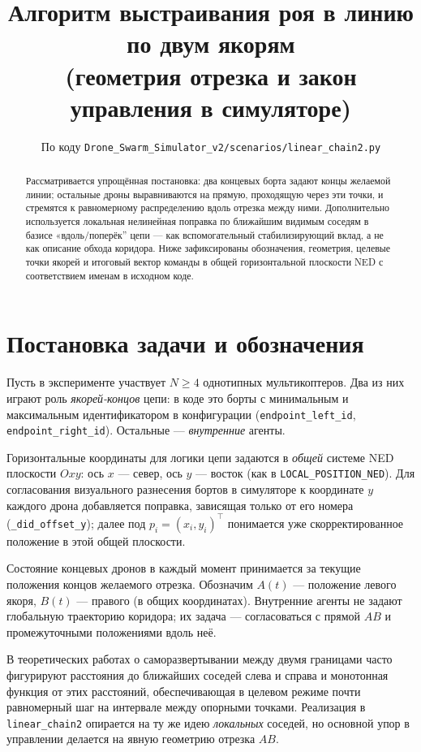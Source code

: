 \documentclass[12pt,a4paper]{article}
\title{Алгоритм выстраивания роя в линию по двум якорям\\
(геометрия отрезка и закон управления в симуляторе)}
\author{По коду \texttt{Drone\_Swarm\_Simulator\_v2/scenarios/linear\_chain2.py}}
\date{}
\begin{document}
\maketitle

\begin{abstract}
Рассматривается упрощённая постановка: два концевых борта задают концы желаемой линии; остальные дроны выравниваются на прямую, проходящую через эти точки, и стремятся к равномерному распределению вдоль отрезка между ними. Дополнительно используется локальная нелинейная поправка по ближайшим видимым соседям в базисе «вдоль/поперёк'' цепи --- как вспомогательный стабилизирующий вклад, а не как описание обхода коридора. Ниже зафиксированы обозначения, геометрия, целевые точки якорей и итоговый вектор команды в общей горизонтальной плоскости NED с соответствием именам в исходном коде.
\end{abstract}

\section{Постановка задачи и обозначения}

Пусть в эксперименте участвует $N \ge 4$ однотипных мультикоптеров. Два из них играют роль \emph{якорей-концов} цепи: в коде это борты с минимальным и максимальным идентификатором в конфигурации (\texttt{endpoint\_left\_id}, \texttt{endpoint\_right\_id}). Остальные --- \emph{внутренние} агенты.

Горизонтальные координаты для логики цепи задаются в \emph{общей} системе NED плоскости $Oxy$: ось $x$ --- север, ось $y$ --- восток (как в \texttt{LOCAL\_POSITION\_NED}). Для согласования визуального разнесения бортов в симуляторе к координате $y$ каждого дрона добавляется поправка, зависящая только от его номера (\texttt{\_did\_offset\_y}); далее под $p_i = (x_i, y_i)^\top$ понимается уже скорректированное положение в этой общей плоскости.

Состояние концевых дронов в каждый момент принимается за текущие положения концов желаемого отрезка. Обозначим $A(t)$ --- положение левого якоря, $B(t)$ --- правого (в общих координатах). Внутренние агенты не задают глобальную траекторию коридора; их задача --- согласоваться с прямой $AB$ и промежуточными положениями вдоль неё.

В теоретических работах о саморазвертывании между двумя границами часто фигурируют расстояния до ближайших соседей слева и справа и монотонная функция от этих расстояний, обеспечивающая в целевом режиме почти равномерный шаг на интервале между опорными точками. Реализация в \texttt{linear\_chain2} опирается на ту же идею \emph{локальных} соседей, но основной упор в управлении делается на явную геометрию отрезка $AB$.
\end{document}
